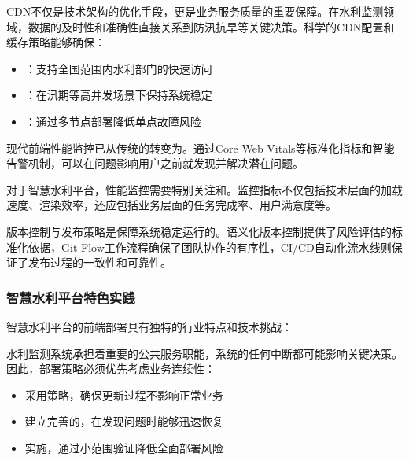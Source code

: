 
CDN不仅是技术架构的优化手段，更是业务服务质量的重要保障。在水利监测领域，数据的及时性和准确性直接关系到防汛抗旱等关键决策。科学的CDN配置和缓存策略能够确保：

\begin{itemize}
\tightlist
\item
  ：支持全国范围内水利部门的快速访问
\item
  ：在汛期等高并发场景下保持系统稳定
\item
  ：通过多节点部署降低单点故障风险
\end{itemize}


现代前端性能监控已从传统的转变为。通过Core Web Vitals等标准化指标和智能告警机制，可以在问题影响用户之前就发现并解决潜在问题。

对于智慧水利平台，性能监控需要特别关注和。监控指标不仅包括技术层面的加载速度、渲染效率，还应包括业务层面的任务完成率、用户满意度等。


版本控制与发布策略是保障系统稳定运行的。语义化版本控制提供了风险评估的标准化依据，Git Flow工作流程确保了团队协作的有序性，CI/CD自动化流水线则保证了发布过程的一致性和可靠性。

\hypertarget{ux667aux6167ux6c34ux5229ux5e73ux53f0ux7279ux8272ux5b9eux8df5}{%
\subsubsection{智慧水利平台特色实践}\label{ux667aux6167ux6c34ux5229ux5e73ux53f0ux7279ux8272ux5b9eux8df5}}

智慧水利平台的前端部署具有独特的行业特点和技术挑战：


水利监测系统承担着重要的公共服务职能，系统的任何中断都可能影响关键决策。因此，部署策略必须优先考虑业务连续性：

\begin{itemize}
\tightlist
\item
  采用策略，确保更新过程不影响正常业务
\item
  建立完善的，在发现问题时能够迅速恢复
\item
  实施，通过小范围验证降低全面部署风险
\end{itemize}

